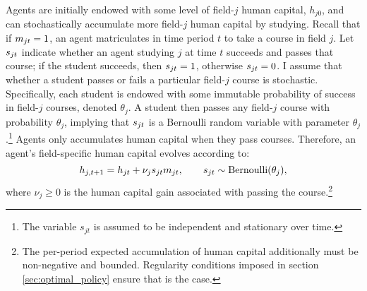 
Agents are initially endowed with some level of field-$j$ human capital, $h_{j0}$, and can stochastically accumulate more field-$j$ human capital by studying.
Recall that if $m_{jt}=1$, an agent matriculates in time period $t$ to take a course in field $j$.
Let $s_{jt}$ indicate whether an agent studying $j$ at time $t$ succeeds and passes that course; if the student succeeds, then $s_{jt} = 1$, otherwise $s_{jt} = 0$.
I assume that whether a student passes or fails a particular field-$j$ course is stochastic. 
Specifically, each student is endowed with some immutable probability of success in field-$j$ courses, denoted $\theta_j$.
A student then passes any field-$j$ course with probability $\theta_j$, implying that $s_{jt}$ is a Bernoulli random variable with parameter $\theta_j$.\footnote{
    The variable $s_{jt}$ is assumed to be independent and stationary over time. 
}
Agents only accumulates human capital when they pass courses.
Therefore, an agent's field-specific human capital evolves according to:
\begin{equation}\label{eq:hc_accumulation}
    h_{j,t+1} = h_{jt} + \nu_j s_{jt} m_{jt},
    \quad \quad
    s_{jt} \sim \text{Bernoulli} (\theta_j),
\end{equation}
where $\nu_j \geq 0$ is the human capital gain associated with passing the course.\footnote{
    The per-period expected accumulation of human capital additionally must be non-negative and bounded. Regularity conditions imposed in section \ref{sec:optimal_policy} ensure that is the case.
}

